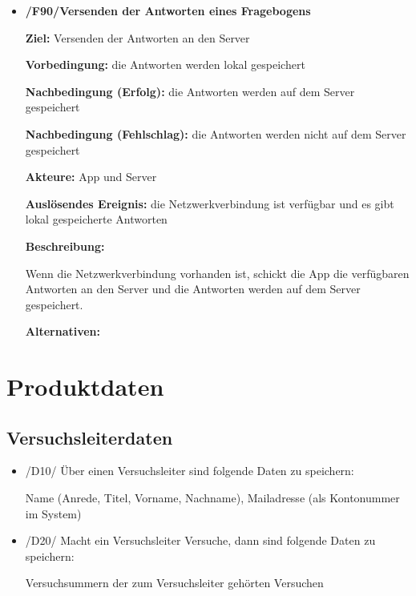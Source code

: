 \documentclass[a4paper]{scrreprt}
\begin{document}
\begin{itemize}
            \item \textbf{/F90/Versenden der Antworten eines Fragebogens}
            
            \par \textbf{Ziel: }Versenden der Antworten an den Server
            \par \textbf{Vorbedingung: }die Antworten werden lokal gespeichert
            \par \textbf{Nachbedingung (Erfolg): }die Antworten werden auf dem Server gespeichert
            \par \textbf{Nachbedingung (Fehlschlag): }die Antworten werden nicht auf dem Server gespeichert
            \par \textbf{Akteure: }App und Server
            \par \textbf{Auslösendes Ereignis: }die Netzwerkverbindung ist verfügbar und es gibt lokal gespeicherte Antworten
            \par \textbf{Beschreibung: }
            \par Wenn die Netzwerkverbindung vorhanden ist, schickt die App die verfügbaren Antworten an den Server und die Antworten werden auf dem Server gespeichert. 
            \par \textbf{Alternativen: }

        \end{itemize}
 
    \chapter{Produktdaten}
        \section{Versuchsleiterdaten}
            \begin{itemize}
                \item /D10/ Über einen Versuchsleiter sind folgende Daten zu speichern:
                    \par Name (Anrede, Titel, Vorname, Nachname), Mailadresse (als Kontonummer im System)
                    
                \item /D20/ Macht ein Versuchsleiter Versuche, dann sind folgende Daten zu speichern:
                    \par Versuchsummern der zum Versuchsleiter gehörten Versuchen
            \end{itemize}
            
\end{document}
